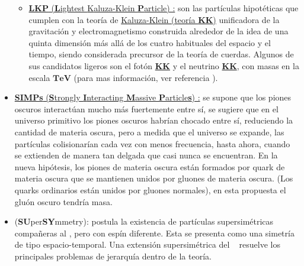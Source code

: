 \begin{itemize}
\begin{itemize}

\item \href{https://en.wikipedia.org/wiki/Kaluza\%E2\%80\%93Klein_theory}{\textbf{LKP} (\textbf{L}ightest {K}aluza-Klein \textbf{P}article) :} son las partículas hipotéticas que cumplen con la teoría de \href{https://en.wikipedia.org/wiki/Kaluza\%E2\%80\%93Klein_theory}{Kaluza-Klein (teoría \textbf{KK})} unificadora de la gravitación y electromagnetismo construida alrededor de la idea de una quinta dimensión más allá de los cuatro habituales del espacio y el tiempo, siendo considerada precursor de la teoría de cuerdas. Algunos de sus candidatos ligeros son el fotón \href{https://en.wikipedia.org/wiki/Kaluza\%E2\%80\%93Klein_theory}{\textbf{KK}} y el neutrino \href{https://en.wikipedia.org/wiki/Kaluza\%E2\%80\%93Klein_theory}{\textbf{KK}}, con masas en la escala $\mathbf{TeV}$ (para mas información, ver referencia \cite{servant_is_2003}).

\end{itemize}
\item \href{https://es.scribd.com/document/273103231/Dark-Pion-Particles-May-Explain-Universe-s-Invisible-Matter}{\textbf{SIMPs} (\textbf{S}trongly \textbf{I}nteracting \textbf{M}assive \textbf{P}article\textbf{s}) :} se supone que los piones oscuros interactúan mucho más fuertemente entre sí, se sugiere que en el universo primitivo los piones oscuros habrían chocado entre sí, reduciendo la cantidad de materia oscura, pero a medida que el universo se expande, las partículas colisionarían cada vez con menos frecuencia, hasta ahora, cuando se extienden de manera tan delgada que casi nunca se encuentran. En la nueva hipótesis, los piones de materia oscura están formados por quark de materia oscura que se mantienen unidos por gluones de materia oscura. (Los quarks ordinarios están unidos por gluones normales), en esta propuesta el gluón oscuro tendría masa.

\item  \SUSY (\textbf{SU}per\textbf{SY}mmetry): postula la existencia de partículas supersimétricas compañeras al \ME, pero con espín diferente. Esta se presenta como una simetría de tipo espacio-temporal. Una extensión supersimétrica del \ME ~ resuelve los principales problemas de jerarquía dentro de la teoría.
\end{itemize}

